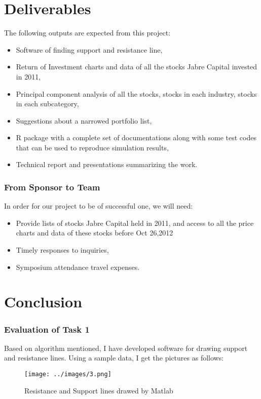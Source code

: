 \documentclass[compress,handout,10pt]{beamer}
\let\olditem\item
\renewcommand{\item}{\setlength{\itemsep}{0.5\baselineskip}\olditem}
\begin{document}
\section{Deliverables}
\begin{frame}
The following outputs are expected from this project:
\begin{itemize}
    \item Software of finding support and resistance line,
    \item Return of Investment charts and data of all the stocks Jabre Capital invested in 2011,
    \item Principal component analysis of all the stocks, stocks in each industry, stocks in each subcategory,
    \item Suggestions about a narrowed portfolio list,
    \item R package with a complete set of documentations along with some test codes that can be used to reproduce simulation results,
    \item Technical report and presentations summarizing the work. 
\end{itemize}

\end{frame}

\begin{frame}
    \frametitle{From Sponsor to Team}
In order for our project to be of successful one, we will need:
\begin{itemize}
    \item Provide lists of stocks Jabre Capital held in 2011, and access to all the price charts and data of these stocks before Oct 26,2012
     \item Timely responses to inquiries, 
    \item Symposium attendance travel expenses.
\end{itemize}


\end{frame}

\section{Conclusion}
\begin{frame}
    \frametitle{Evaluation of Task 1}
Based on algorithm mentioned, I have developed software for drawing support and resistance lines. 
Using a sample data, I get the pictures as follows:
\begin{figure}[h]
    \begin{center}
        \texttt{[image: ../images/3.png]}
    \end{center}
    \caption{Resistance and Support lines drawed by Matlab}
    \label{fig:rs}
\end{figure}  


\end{frame}
\end{document}
